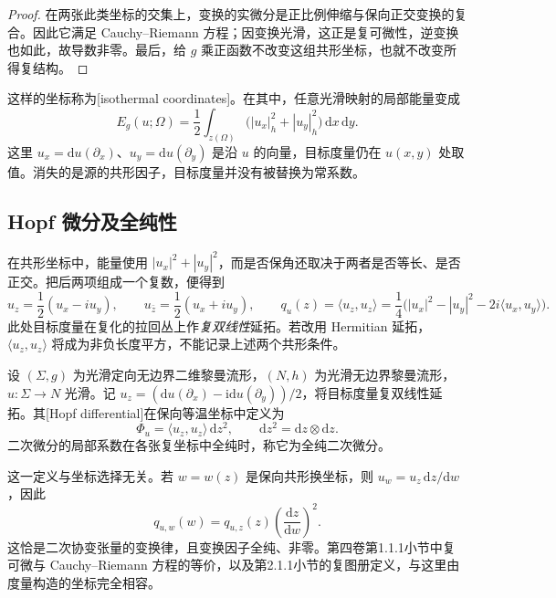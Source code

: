 \begin{proof}
	在两张此类坐标的交集上，变换的实微分是正比例伸缩与保向正交变换的复合。因此它满足 Cauchy--Riemann 方程；因变换光滑，这正是复可微性，逆变换也如此，故导数非零。最后，给 \(g\) 乘正函数不改变这组共形坐标，也就不改变所得复结构。
\end{proof}

这样的坐标称为[isothermal coordinates]。在其中，任意光滑映射的局部能量变成
\begin{equation}\label{g3:eq:surface-energy-isothermal}
	E_g(u;\Omega)=\frac12\int_{z(\Omega)}
	\bigl(|u_x|_h^2+|u_y|_h^2\bigr)\,\mathrm dx\,\mathrm dy.
\end{equation}
这里 \(u_x=\mathrm du(\partial_x)\)、\(u_y=\mathrm du(\partial_y)\) 是沿 \(u\) 的向量，目标度量仍在 \(u(x,y)\) 处取值。消失的是源的共形因子，目标度量并没有被替换为常系数。

\subsection{Hopf 微分及全纯性}
\label{g3:subsec:1804:02}
在共形坐标中，能量使用 \(|u_x|^2+|u_y|^2\)，而是否保角还取决于两者是否等长、是否正交。把后两项组成一个复数，便得到
\[
	u_z=\frac12(u_x-iu_y),\qquad
	u_{\bar z}=\frac12(u_x+iu_y),\qquad
	q_u(z)=\langle u_z,u_z\rangle
	=\frac14\bigl(|u_x|^2-|u_y|^2-2i\langle u_x,u_y\rangle\bigr).
\]
此处目标度量在复化的拉回丛上作\emph{复双线性}延拓。若改用 Hermitian 延拓，\(\langle u_z,u_z\rangle\) 将成为非负长度平方，不能记录上述两个共形条件。

\begin{definition}\label{g3:def:hopf-differential}
	设 \((\Sigma,g)\) 为光滑定向无边界二维黎曼流形，\((N,h)\) 为光滑无边界黎曼流形，\(u:\Sigma\to N\) 光滑。记 \(u_z=(\mathrm du(\partial_x)-\mathrm i\mathrm du(\partial_y))/2\)，将目标度量复双线性延拓。其[Hopf differential]在保向等温坐标中定义为
	\begin{equation}\label{g3:eq:hopf-differential}
		\Phi_u=\langle u_z,u_z\rangle\,\mathrm dz^2,
		\qquad \mathrm dz^2=\mathrm dz\otimes\mathrm dz.
	\end{equation}
	二次微分的局部系数在各张复坐标中全纯时，称它为全纯二次微分。
\end{definition}

这一定义与坐标选择无关。若 \(w=w(z)\) 是保向共形换坐标，则
\(u_w=u_z\,\mathrm dz/\mathrm dw\)，因此
\[
	q_{u,w}(w)=q_{u,z}(z)\left(\frac{\mathrm dz}{\mathrm dw}\right)^2.
\]
这恰是二次协变张量的变换律，且变换因子全纯、非零。第四卷第1.1.1小节中复可微与 Cauchy--Riemann 方程的等价，以及第2.1.1小节的复图册定义，与这里由度量构造的坐标完全相容。

